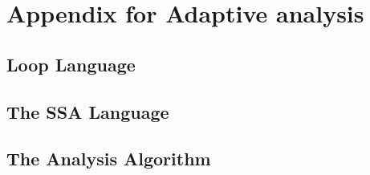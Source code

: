 \chapter{Appendix for Adaptive analysis }
\label{AppC}


% 
\section{Loop Language}

\clearpage

\section{The SSA Language}
\label{appendixC:ssa}

\clearpage

\section{The Analysis Algorithm}


% 

% 

